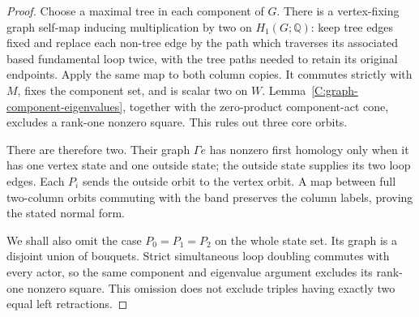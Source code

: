 \begin{proof}
Choose a maximal tree in each component of $G$.  There is a
vertex-fixing graph self-map inducing multiplication by two
on $H_1(G;\mathbb Q)$: keep tree edges fixed and replace each
non-tree edge by the path which traverses its associated based
fundamental loop twice, with the tree paths needed to retain its
original endpoints.  Apply the same map to both column copies.
It commutes strictly with $M$, fixes the component set, and is
scalar two on $W$.  Lemma~\ref{C:graph-component-eigenvalues},
together with the zero-product component-act cone, excludes a
rank-one nonzero square.  This rules out three core orbits.

There are therefore two.  Their graph $\Gamma e$ has nonzero
first homology only when it has one vertex state and one outside
state; the outside state supplies its two loop edges.  Each
$P_i$ sends the outside orbit to the vertex orbit.  A map between
full two-column orbits commuting with the band preserves the
column labels, proving the stated normal form.

We shall also omit the case $P_0=P_1=P_2$ on the whole state set.
Its graph is a disjoint union of bouquets.  Strict simultaneous
loop doubling commutes with every actor, so the same component
and eigenvalue argument excludes its rank-one nonzero square.
This omission does not exclude triples having exactly two equal
left retractions.
\end{proof}

